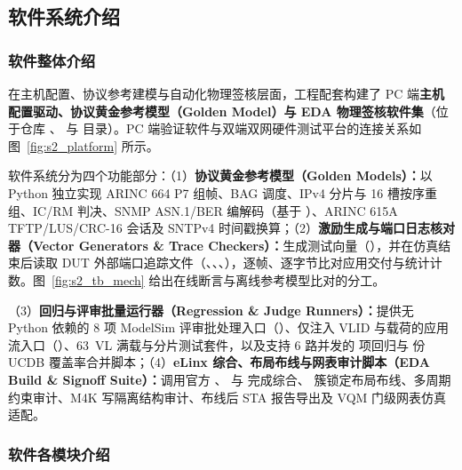 \endgroup
\FloatBarrier
\subsection{软件系统介绍}

\subsubsection{软件整体介绍}

在主机配置、协议参考建模与自动化物理签核层面，工程配套构建了 PC 端\textbf{主机配置驱动、协议黄金参考模型（Golden Model）与 EDA 物理签核软件集}（位于仓库 、 与  目录）。PC 端验证软件与双端双网硬件测试平台的连接关系如图~\ref{fig:s2_platform} 所示。


软件系统分为四个功能部分：（1）\textbf{协议黄金参考模型（Golden Models）：}以 Python 独立实现 ARINC 664 P7 组帧、BAG 调度、IPv4 分片与 16 槽按序重组、IC/RM 判决、SNMP ASN.1/BER 编解码（基于 ）、ARINC 615A TFTP/LUS/CRC-16 会话及 SNTPv4 时间戳换算；（2）\textbf{激励生成与端口日志核对器（Vector Generators \& Trace Checkers）：}生成测试向量（），并在仿真结束后读取 DUT 外部端口追踪文件（、、、），逐帧、逐字节比对应用交付与统计计数。图~\ref{fig:s2_tb_mech} 给出在线断言与离线参考模型比对的分工。


（3）\textbf{回归与评审批量运行器（Regression \& Judge Runners）：}提供无 Python 依赖的 8 项 ModelSim 评审批处理入口（）、仅注入 VLID 与载荷的应用流入口（）、63~VL 满载与分片测试套件，以及支持 6 路并发的 \RegCount{} 项回归与 \CovUcdbCount{} 份 UCDB 覆盖率合并脚本；（4）\textbf{eLinx 综合、布局布线与网表审计脚本（EDA Build \& Signoff Suite）：}调用官方 、 与  完成综合、\countsep{\LockedClusters} 簇锁定布局布线、多周期约束审计、M4K 写隔离结构审计、布线后 STA 报告导出及 VQM 门级网表仿真适配。

\subsubsection{软件各模块介绍}

